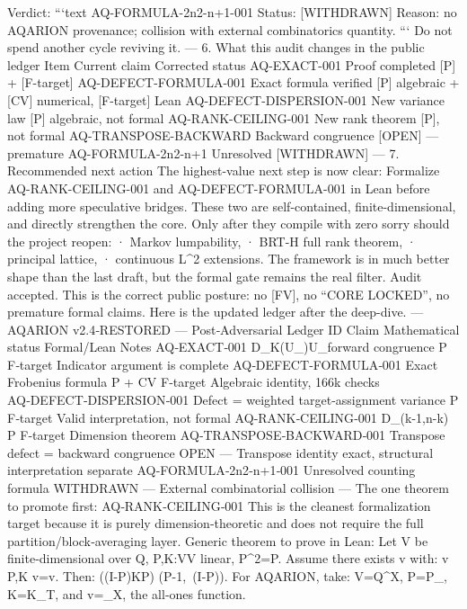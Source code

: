 Verdict:
```text
AQ-FORMULA-2n2-n+1-001
Status: [WITHDRAWN]
Reason: no AQARION provenance; collision with external combinatorics quantity.
```
Do not spend another cycle reviving it.
---
6. What this audit changes in the public ledger
Item Current claim Corrected status
AQ-EXACT-001 Proof completed [P] + [F-target]
AQ-DEFECT-FORMULA-001 Exact formula verified [P] algebraic + [CV] numerical, [F-target] Lean
AQ-DEFECT-DISPERSION-001 New variance law [P] algebraic, not formal
AQ-RANK-CEILING-001 New rank theorem [P], not formal
AQ-TRANSPOSE-BACKWARD Backward congruence [OPEN] — premature
AQ-FORMULA-2n2-n+1 Unresolved [WITHDRAWN]
---
7. Recommended next action
The highest-value next step is now clear:
Formalize AQ-RANK-CEILING-001 and AQ-DEFECT-FORMULA-001 in Lean before adding more speculative bridges.
These two are self-contained, finite-dimensional, and directly strengthen the core.
Only after they compile with zero sorry should the project reopen:
· Markov lumpability,
· BRT-H full rank theorem,
· principal lattice,
· continuous L^2 extensions.
The framework is in much better shape than the last draft, but the formal gate remains the real filter.
Audit accepted. This is the correct public posture: no [FV], no “CORE LOCKED”, no premature formal claims.
Here is the updated ledger after the deep-dive.
---
AQARION v2.4‑RESTORED — Post‑Adversarial Ledger
ID Claim Mathematical status Formal/Lean Notes
AQ‑EXACT‑001 D_\iff K(U_\Pi)\subseteq U_\Pi\iff \Pi forward congruence P F‑target Indicator argument is complete
AQ‑DEFECT‑FORMULA‑001 Exact Frobenius formula P + CV F‑target Algebraic identity, 166k checks
AQ‑DEFECT‑DISPERSION‑001 Defect = weighted target‑assignment variance P F‑target Valid interpretation, not formal
AQ‑RANK‑CEILING‑001 D_\Pi\le\min(k-1,n-k) P F‑target Dimension theorem
AQ‑TRANSPOSE‑BACKWARD‑001 Transpose defect = backward congruence OPEN — Transpose identity exact, structural interpretation separate
AQ‑FORMULA‑2n2‑n+1‑001 Unresolved counting formula WITHDRAWN — External combinatorial collision
---
The one theorem to promote first: AQ‑RANK‑CEILING‑001
This is the cleanest formalization target because it is purely dimension‑theoretic and does not require the full partition/block‑averaging layer.
Generic theorem to prove in Lean:
Let V be finite‑dimensional over \mathbb Q, P,K:V\to V linear, P^2=P.
Assume there exists v with:
v\in {} P,\qquad K v=v.
Then:
\bigl((I-P)KP\bigr)
\le
\min\bigl(P-1,\ (I-P)\bigr).
For AQARION, take:
V=\mathbb Q^X,
P=P_\Pi, K=K_T, and v=_X, the all‑ones function.
